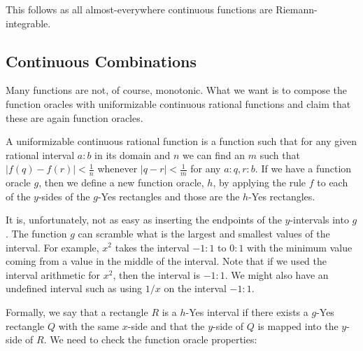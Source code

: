 \documentclass[12pt]{article}
\theoremstyle{remark}
\begin{document}
This follows as all almost-everywhere continuous functions are Riemann-integrable. 


\subsection{Continuous Combinations}

Many functions are not, of course, monotonic. What we want is to compose the function oracles with uniformizable continuous rational functions and claim that these are again function oracles. 

A uniformizable continuous rational function is a function such that for any given rational interval $a:b$ in its domain and $n$ we can find an $m$ such that $|f(q) - f(r)| < \frac{1}{n} $ whenever $|q-r| < \frac{1}{m}$ for any $a:q,r:b$. If we have a function oracle $g$, then we define a new function oracle, $h$, by applying the rule $f$ to each of the $y$-sides of the $g$-Yes rectangles and those are the $h$-Yes rectangles. 

It is, unfortunately, not as easy as inserting the endpoints of the $y$-intervals into $g$. The function $g$ can scramble what is the largest and smallest values of the interval. For example, $x^2$ takes the interval $-1:1$ to $0:1$ with the minimum value coming from a value in the middle of the interval. Note that if we used the interval arithmetic for $x^2$, then the interval is $-1:1$. We might also have an undefined interval such as using $1/x$ on the interval $-1:1$.

Formally, we say that a rectangle $R$ is a $h$-Yes interval if there exists a $g$-Yes rectangle $Q$ with the same $x$-side and that the $y$-side of $Q$ is mapped into the $y$-side of $R$. We need to check the function oracle properties: 
\end{document}
